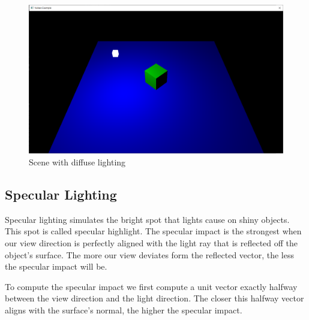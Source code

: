 \begin{minipage}{\linewidth}{\noindent}
    
\end{minipage}

\begin{figure}[H]
    \centering
    \includegraphics[scale=0.25]{images/ChBlinnPhong/SceneDiffuse.png}
    \caption{Scene with diffuse lighting}
    \label{fig::SceneDiffuse}
\end{figure}

\subsection{Specular Lighting}

Specular lighting simulates the bright spot that lights cause on shiny objects.
This spot is called specular highlight.
The specular impact is the strongest when our view direction is perfectly
aligned with the light ray that is reflected off the object's surface.
The more our view deviates form the reflected vector, the less the specular
impact will be.

To compute the specular impact we first compute a unit vector exactly
halfway between the view direction and the light direction.
The closer this halfway vector aligns with the surface's normal, the higher
the specular impact.

